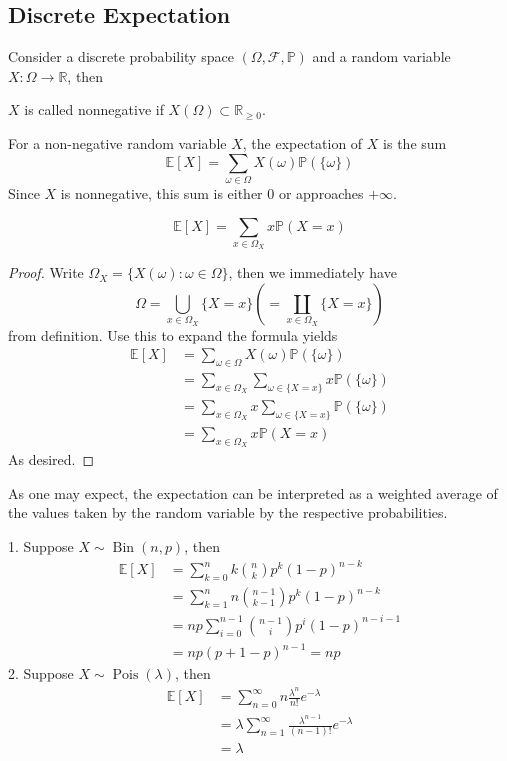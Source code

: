 \subsection{Discrete Expectation}
Consider a discrete probability space $(\Omega,\mathscr F,\mathbb P)$ and a random variable $X:\Omega\to\mathbb R$, then
\begin{definition}
    $X$ is called nonnegative if $X(\Omega)\subset\mathbb R_{\ge 0}$.
\end{definition}
\begin{definition}
    For a non-negative random variable $X$, the expectation of $X$ is the sum
    $$\mathbb E[X]=\sum_{\omega\in\Omega}X(\omega)\mathbb P(\{\omega\})$$
    Since $X$ is nonnegative, this sum is either $0$ or approaches $+\infty$.
\end{definition}
\begin{lemma}\label{expectation_formula}
    $$\mathbb E[X]=\sum_{x\in\Omega_X}x\mathbb P(X=x)$$
\end{lemma}
\begin{proof}
    Write $\Omega_X=\{X(\omega):\omega\in\Omega\}$, then we immediately have
    $$\Omega=\bigcup_{x\in\Omega_X}\{X=x\}\left( =\coprod_{x\in\Omega_X}\{X=x\} \right)$$
    from definition.
    Use this to expand the formula yields
    \begin{align*}
        \mathbb E[X]&=\sum_{\omega\in\Omega}X(\omega)\mathbb P(\{\omega\})\\
        &=\sum_{x\in\Omega_X}\sum_{\omega\in\{X=x\}}x\mathbb P(\{\omega\})\\
        &=\sum_{x\in\Omega_X}x\sum_{\omega\in\{X=x\}}\mathbb P(\{\omega\})\\
        &=\sum_{x\in\Omega_X}x\mathbb P(X=x)
    \end{align*}
    As desired.
\end{proof}
As one may expect, the expectation can be interpreted as a weighted average of the values taken by the random variable by the respective probabilities.
\begin{example}
    1. Suppose $X\sim\operatorname{Bin}(n,p)$, then
    \begin{align*}
        \mathbb E[X]&=\sum_{k=0}^nk\binom{n}{k}p^k(1-p)^{n-k}\\
        &=\sum_{k=1}^nn\binom{n-1}{k-1}p^k(1-p)^{n-k}\\
        &=np\sum_{i=0}^{n-1}\binom{n-1}{i}p^i(1-p)^{n-i-1}\\
        &=np(p+1-p)^{n-1}=np
    \end{align*}
    2. Suppose $X\sim\operatorname{Pois}(\lambda)$, then
    \begin{align*}
        \mathbb E[X]&=\sum_{n=0}^\infty n\frac{\lambda^n}{n!}e^{-\lambda}\\
        &=\lambda\sum_{n=1}^\infty\frac{\lambda^{n-1}}{(n-1)!}e^{-\lambda}\\
        &=\lambda
    \end{align*}
\end{example}
